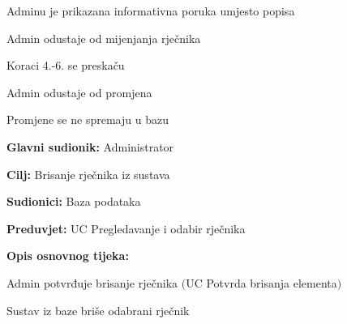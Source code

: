 \begin{packed_item}
\begin{packed_item}
\begin{packed_enum}
			\item Adminu je prikazana informativna poruka umjesto popisa
			\item Admin odustaje od mijenjanja rječnika
			\item Koraci 4.-6. se preskaču
			
		\end{packed_enum}

		\item[5.a] Admin odustaje od promjena
		\item[] \begin{packed_enum}
			
			\item Promjene se ne spremaju u bazu
			
		\end{packed_enum}
		
	\end{packed_item}

\end{packed_item}
					

\noindent {}
\begin{packed_item}

	\item \textbf{Glavni sudionik:} Administrator
	\item  \textbf{Cilj:} Brisanje rječnika iz sustava
	\item  \textbf{Sudionici:} Baza podataka
	\item  \textbf{Preduvjet:} UC Pregledavanje i odabir rječnika
	\item  \textbf{Opis osnovnog tijeka:}
	
	\item[] \begin{packed_enum}

		\item Admin potvrđuje brisanje rječnika $($UC Potvrda brisanja elementa$)$
		\item Sustav iz baze briše odabrani rječnik
	\end{packed_enum}

\end{packed_item}

